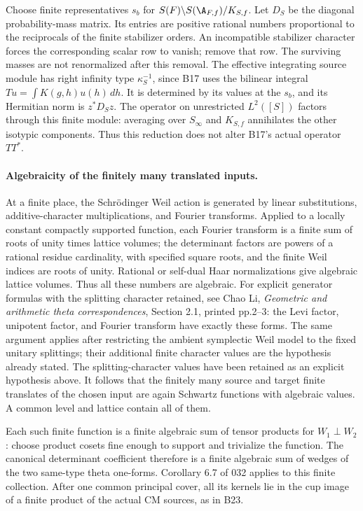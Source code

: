 Choose finite representatives $s_b$ for
$S(F)\backslash S(\A_{F,f})/K_{S,f}$.  Let $D_S$ be
the diagonal probability-mass matrix.  Its entries
are positive rational numbers proportional to the
reciprocals of the finite stabilizer orders.
An incompatible stabilizer character forces the
corresponding scalar row to vanish; remove that row.
The surviving masses are not renormalized after
this removal.
The effective integrating source module has right
infinity type $\kappa_S^{-1}$, since B17 uses the
bilinear integral $Tu=\int K(g,h)u(h)\,dh$.
It is determined by its values at the $s_b$, and
its Hermitian norm is $z^*D_Sz$.
The operator on unrestricted $L^2([S])$ factors
through this finite module: averaging over
$S_\infty$ and $K_{S,f}$ annihilates the other
isotypic components.  Thus this reduction does not
alter B17's actual operator $TT^*$.

\paragraph{Algebraicity of the finitely many translated inputs.}
At a finite place, the Schr\"odinger Weil action is
generated by linear substitutions, additive-character
multiplications, and Fourier transforms.  Applied to
a locally constant compactly supported function,
each Fourier transform is a finite sum of roots of
unity times lattice volumes; the determinant factors
are powers of a rational residue cardinality, with
specified square roots, and the finite Weil indices
are roots of unity.  Rational or self-dual Haar
normalizations give algebraic lattice volumes.
Thus all these numbers are algebraic.
For explicit generator formulas with the splitting
character retained, see Chao Li, \emph{Geometric and
arithmetic theta correspondences}, Section 2.1,
printed pp.2--3: the Levi factor, unipotent factor,
and Fourier transform have exactly these forms.
The same argument applies after restricting the
ambient symplectic Weil model to the fixed unitary
splittings; their additional finite character
values are the hypothesis already stated.
The splitting-character values have been retained
as an explicit hypothesis above.  It follows that
the finitely many source and target finite translates
of the chosen input are again Schwartz functions
with algebraic values.  A common level and lattice
contain all of them.

Each such finite function is a finite algebraic sum
of tensor products for $W_1\perp W_2$: choose product
cosets fine enough to support and trivialize the
function.  The canonical determinant coefficient
therefore is a finite algebraic sum of wedges of
the two same-type theta one-forms.  Corollary 6.7
of 032 applies to this finite collection.  After
one common principal cover, all its kernels lie
in the cup image of a finite product of the actual
CM sources, as in B23.

